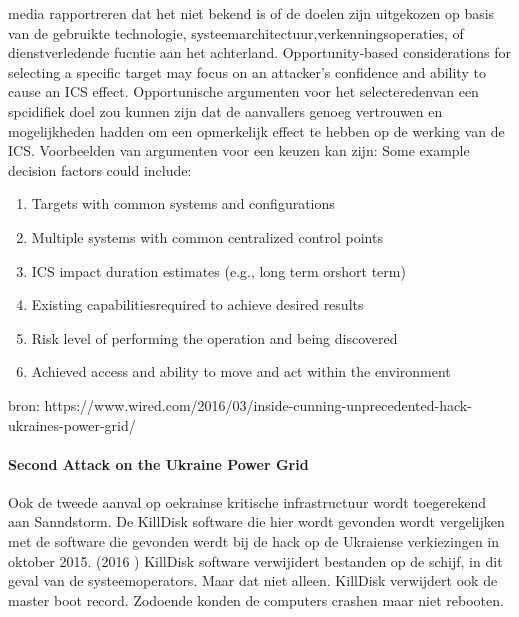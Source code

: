 {media rapportreren dat het niet bekend is of de doelen zijn uitgekozen op basis van de gebruikte
technologie, systeemarchitectuur,verkenningsoperaties, of dienstverledende fucntie aan het
achterland.
Opportunity‐based considerations for selecting a specific target may focus on an attacker’s
confidence and ability to cause an ICS effect. Opportunische argumenten voor het selecteredenvan
een spcidifiek doel zou kunnen zijn dat de aanvallers genoeg vertrouwen en mogelijkheden hadden
om een opmerkelijk effect te hebben op de werking van de ICS.
Voorbeelden van argumenten voor een keuzen kan zijn:
Some example decision factors could include:

\begin{enumerate}
	\item Targets with common systems and configurations
	\item  Multiple systems with common centralized control points
	\item ICS impact duration estimates (e.g., long term orshort term)
	\item Existing capabilitiesrequired to achieve desired results
	\item Risk level of performing the operation and being discovered
	\item Achieved access and ability to move and act within the environment
\end{enumerate}
 

bron: https://www.wired.com/2016/03/inside-cunning-unprecedented-hack-ukraines-power-grid/

\paragraph{Second Attack on the Ukraine Power Grid}


Ook de tweede aanval op oekrainse kritische infrastructuur wordt toegerekend aan Sanndstorm. De
KillDisk software die hier wordt gevonden wordt vergelijken met de software die gevonden werdt bij
de hack op de Ukraiense verkiezingen in oktober 2015. (2016 ) KillDisk software verwijidert
bestanden op de schijf, in dit geval van de systeemoperators. Maar dat niet alleen. KillDisk verwijdert
ook de master boot record. Zodoende konden de computers crashen maar niet rebooten.

}
